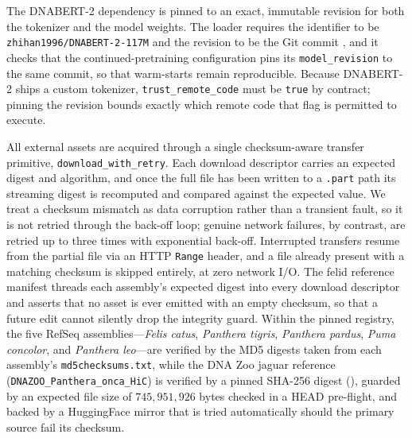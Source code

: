 \documentclass[twocolumn,10pt]{article}
\begin{document}
The DNABERT-2 dependency is pinned to an exact, immutable revision for both the tokenizer and the
model weights. The loader requires the identifier to be \texttt{zhihan1996/DNABERT-2-117M} and the
revision to be the Git commit \texttt{}, and it
checks that the continued-pretraining configuration pins its \texttt{model\_revision} to the same
commit, so that warm-starts remain reproducible. Because DNABERT-2 ships a custom tokenizer,
\texttt{trust\_remote\_code} must be \texttt{true} by contract; pinning the revision bounds exactly
which remote code that flag is permitted to execute.

All external assets are acquired through a single checksum-aware transfer primitive,
\texttt{download\_with\_retry}. Each download descriptor carries an expected digest and algorithm,
and once the full file has been written to a \texttt{.part} path its streaming digest is recomputed
and compared against the expected value. We treat a checksum mismatch as data corruption rather than
a transient fault, so it is not retried through the back-off loop; genuine network failures, by
contrast, are retried up to three times with exponential back-off. Interrupted transfers resume from
the partial file via an HTTP \texttt{Range} header, and a file already present with a matching
checksum is skipped entirely, at zero network I/O. The felid reference manifest threads each
assembly's expected digest into every download descriptor and asserts that no asset is ever emitted
with an empty checksum, so that a future edit cannot silently drop the integrity guard. Within the
pinned registry, the five RefSeq assemblies---\emph{Felis catus}, \emph{Panthera tigris},
\emph{Panthera pardus}, \emph{Puma concolor}, and \emph{Panthera leo}---are verified by the MD5
digests taken from each assembly's \texttt{md5checksums.txt}, while the DNA Zoo jaguar reference
(\texttt{DNAZOO\_Panthera\_onca\_HiC}) is verified by a pinned SHA-256 digest
(\texttt{}), guarded by
an expected file size of \(745{,}951{,}926\) bytes checked in a HEAD pre-flight, and backed by a
HuggingFace mirror that is tried automatically should the primary source fail its checksum.
\end{document}

